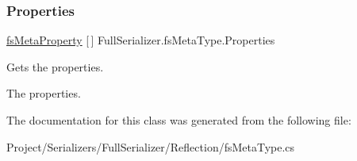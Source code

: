 \subsubsection{\texorpdfstring{Properties}{Properties}}
{\footnotesize\ttfamily \hyperlink{class_full_serializer_1_1_internal_1_1fs_meta_property}{fs\+Meta\+Property} \mbox{[}$\,$\mbox{]} Full\+Serializer.\+fs\+Meta\+Type.\+Properties\hspace{0.3cm}{\ttfamily [get]}}



Gets the properties. 

The properties.

The documentation for this class was generated from the following file\+:\begin{DoxyCompactItemize}
\item 
Project/\+Serializers/\+Full\+Serializer/\+Reflection/fs\+Meta\+Type.\+cs\end{DoxyCompactItemize}
